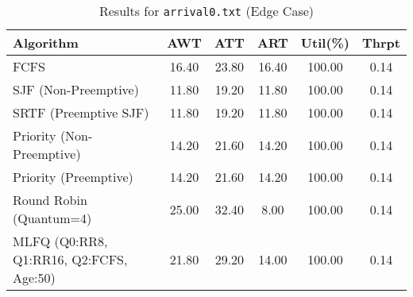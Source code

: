\documentclass[12pt]{article}
\begin{document}
\begin{table}[htbp]
\centering
\caption{Results for \texttt{arrival0.txt} (Edge Case)}
\label{tab:arrival0_results}
\footnotesize
\begin{tabular}{@{}l S[table-format=3.2] S[table-format=3.2] S[table-format=3.2] S[table-format=3.2] S[table-format=1.2]@{}}
\toprule
Algorithm                                     & {AWT} & {ATT} & {ART} & {Util(\%)} & {Thrpt}\\
\midrule
FCFS                                         & 16.40         & 23.80            & 16.40          & 100.00          & 0.14 \\
SJF (Non-Preemptive)                         & 11.80         & 19.20            & 11.80          & 100.00          & 0.14 \\
SRTF (Preemptive SJF)                        & 11.80         & 19.20            & 11.80          & 100.00          & 0.14 \\
Priority (Non-Preemptive)                    & 14.20         & 21.60            & 14.20          & 100.00          & 0.14 \\
Priority (Preemptive)                        & 14.20         & 21.60            & 14.20          & 100.00          & 0.14 \\
Round Robin (Quantum=4)                      & 25.00         & 32.40            & 8.00           & 100.00          & 0.14 \\
MLFQ (Q0:RR8, Q1:RR16, Q2:FCFS, Age:50)      & 21.80         & 29.20            & 14.00          & 100.00          & 0.14 \\
\bottomrule
\end{tabular}
\end{table}
\end{document}
